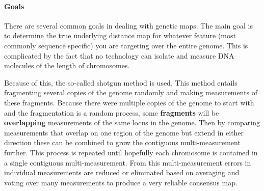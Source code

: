 \documentclass[11pt]{article}
\begin{document}
\paragraph{Goals\newline}
\par{
There are several common goals in dealing with genetic maps.  The main goal is to determine the true underlying distance map for whatever feature (most commonly sequence specific) you are targeting over the entire genome.  This is complicated by the fact that no technology can isolate and measure DNA molecules of the length of chromosomes.  

Because of this, the so-called shotgun method is used.  This method entails fragmenting several copies of the genome randomly and making measurements of these fragments.  Because there were multiple copies of the genome to start with and the fragmentation is a random process, some \textbf{fragments} will be \textbf{overlapping} measurements of the same locus in the genome. Then by comparing measurements that overlap on one region of the genome but extend in either direction these can be combined to grow the contiguous multi-measurement further.  This process is repeated until hopefully each chromosome is contained in a single contiguous multi-measurement. From this multi-measurement errors in individual measurements are reduced or eliminated based on averaging and voting over many measurements to produce a very reliable consensus map.  
}
\end{document}
